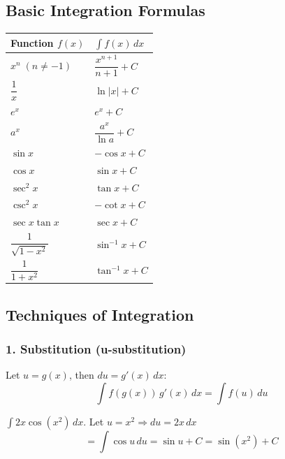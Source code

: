 \documentclass[12pt]{article}
\newcommand{\hcell}[1]{\textbf{\color{white}#1}}
\begin{document}
\subsection{Basic Integration Formulas}

\begin{center}
\renewcommand{\arraystretch}{1.6}
\begin{tabular}{|C{5cm}|C{6cm}|}
  \hline
  \hcell{Function $f(x)$} & \hcell{$\int f(x)\,dx$} \\
  \hline
  $x^n\;(n \neq -1)$ & $\dfrac{x^{n+1}}{n+1} + C$ \\
  $\dfrac{1}{x}$ & $\ln|x| + C$ \\
  $e^x$ & $e^x + C$ \\
  $a^x$ & $\dfrac{a^x}{\ln a} + C$ \\
  $\sin x$ & $-\cos x + C$ \\
  $\cos x$ & $\sin x + C$ \\
  $\sec^2 x$ & $\tan x + C$ \\
  $\csc^2 x$ & $-\cot x + C$ \\
  $\sec x \tan x$ & $\sec x + C$ \\
  $\dfrac{1}{\sqrt{1-x^2}}$ & $\sin^{-1} x + C$ \\
  $\dfrac{1}{1+x^2}$ & $\tan^{-1} x + C$ \\
  \hline
\end{tabular}
\end{center}

\subsection{Techniques of Integration}

\subsubsection*{1. Substitution (u-substitution)}

\begin{formulabox}
Let $u = g(x)$, then $du = g'(x)\,dx$:
\[
  \int f(g(x))\,g'(x)\,dx = \int f(u)\,du
\]
\end{formulabox}

\begin{examplebox*}
$\displaystyle\int 2x\cos(x^2)\,dx$. Let $u = x^2 \Rightarrow du = 2x\,dx$
\[
  = \int \cos u\,du = \sin u + C = \sin(x^2) + C
\]
\end{examplebox*}
\end{document}
